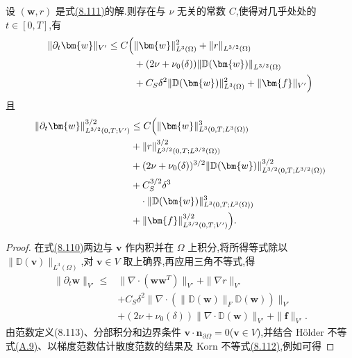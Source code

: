 
\begin{lemma}
\label{lem:smagorinsky-time-derivative-stability}
设 $(\bm{w},r)$ 是式\hyperref[eq:smagorinsky-generalized-weak-form]{(8.111)}的解.则存在与 $\nu$ 无关的常数 $C$,使得对几乎处处的 $t\in[0,T]$,有
\begin{equation}\label{eq:smagorinsky-time-derivative-stability}
\begin{aligned}
 \|\partial_t\bm{w}\|_{V'}\le C\Bigl(&\|\bm{w}\|_{L^3(\Omega)}^2
       +\|r\|_{L^{3/2}(\Omega)}\\
       &+(2\nu+\nu_0(\delta))
          \|\mathbb{D}(\bm{w})\|_{L^{3/2}(\Omega)}\\
       &+C_S\delta^2\|\mathbb{D}(\bm{w})\|_{L^3(\Omega)}^2
       +\|\bm{f}\|_{V'}\Bigr)
\end{aligned}
\end{equation}
且
\[
\begin{aligned}
 \|\partial_t\bm{w}\|_{L^{3/2}(0,T;V')}^{3/2}
       &\le C\Bigl(\|\bm{w}\|_{L^3(0,T;L^3(\Omega))}^3\\
       &+\|r\|_{L^{3/2}(0,T;L^{3/2}(\Omega))}^{3/2}\\
       &+(2\nu+\nu_0(\delta))^{3/2}
          \|\mathbb{D}(\bm{w})\|_{L^{3/2}(0,T;L^{3/2}(\Omega))}^{3/2}\\
       &+C_S^{3/2}\delta^3\\
       &\quad\cdot\|\mathbb{D}(\bm{w})\|_{L^3(0,T;L^3(\Omega))}^3\\
       &+\|\bm{f}\|_{L^{3/2}(0,T;V')}^{3/2}\Bigr).
\end{aligned}
\]
\begin{proof}
在式\hyperref[eq:smagorinsky-strong-form]{(8.110)}两边与 $\bm{v}$ 作内积并在 $\Omega$ 上积分,将所得等式除以 $\|\mathbb{D}(\bm{v})\|_{L^3(\Omega)}$,对 $\bm{v}\in V$ 取上确界,再应用三角不等式,得
\[
\begin{aligned}
 \|\partial_t\bm{w}\|_{V'}\le{}&
   \|\nabla\cdot(\bm{w}\bm{w}^{T})\|_{V'}
   +\|\nabla r\|_{V'}\\
   &+C_S\delta^2
      \|\nabla\cdot(\|\mathbb{D}(\bm{w})\|_F\mathbb{D}(\bm{w}))\|_{V'}\\
   &+(2\nu+\nu_0(\delta))
      \|\nabla\cdot\mathbb{D}(\bm{w})\|_{V'}
   +\|\bm{f}\|_{V'}.
\end{aligned}
\]
由范数定义(8.113)、分部积分和边界条件 $\bm{v}\cdot\bm{n}_{\partial\Omega}=0$($\bm{v}\in V$),并结合 Hölder 不等式\hyperref[eq:appendix-a-9]{(A.9)}、以梯度范数估计散度范数的结果及 Korn 不等式\hyperref[eq:smagorinsky-generalized-korn-inequality]{(8.112)},例如可得

\end{proof}
\end{lemma}
